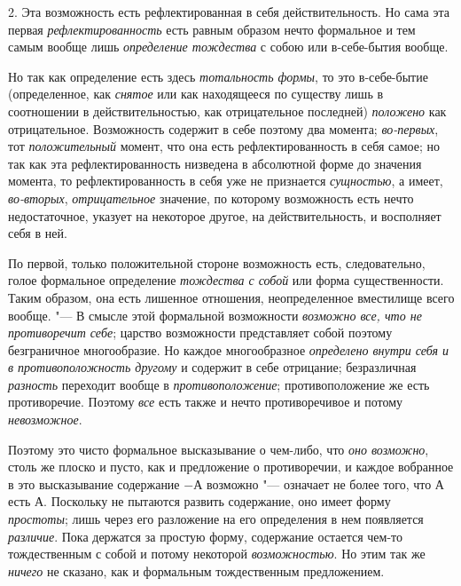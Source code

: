 2. Эта возможность есть рефлектированная в себя действительность. Но сама
эта первая {\em рефлектированность} есть равным образом
нечто формальное и тем самым вообще лишь
{\em определение тождества} с собою или в-себе-бытия
вообще.

Но так как определение есть здесь {\em тотальность
формы}, то это в-себе-бытие (определенное, как
{\em снятое} или как находящееся по существу лишь в
соотношении в действительностью, как отрицательное последней)
{\em положено} как отрицательное. Возможность содержит
в себе поэтому два момента; {\em во-первых}, тот
{\em положительный} момент, что она есть
рефлектированность в себя самое; но так как эта рефлектированность
низведена в абсолютной форме до значения момента, то рефлектированность в
себя уже не признается {\em сущностью}, а имеет,
{\em во-вторых},
{\em отрицательное} значение, по которому возможность
есть нечто недостаточное, указует на некоторое другое, на действительность,
и восполняет себя в ней.

По первой, только положительной стороне возможность есть, следовательно,
голое формальное определение {\em тождества с собой}
или форма существенности. Таким образом, она есть лишенное отношения,
неопределенное вместилище всего вообще. "--- В смысле этой формальной
возможности {\em возможно все, что не противоречит
себе}; царство возможности представляет собой поэтому безграничное
многообразие. Но каждое многообразное {\em определено
внутри себя и в противоположность другому} и содержит в себе отрицание;
безразличная {\em разность} переходит вообще в
{\em противоположение}; противоположение же есть
противоречие. Поэтому {\em все} есть также и нечто
противоречивое и потому {\em невозможное}.

Поэтому это чисто формальное высказывание о чем-либо, что
{\em оно возможно}, столь же плоско и пусто, как и
предложение о противоречии, и каждое вобранное в это высказывание
содержание $-А$ возможно "--- означает не более того, что $А$
есть $А$. Поскольку не пытаются развить содержание, оно имеет форму
{\em простоты}; лишь через его разложение на его
определения в нем появляется {\em различие}. Пока
держатся за простую форму, содержание остается чем-то тождественным с собой
и потому некоторой {\em возможностью}. Но этим так же
{\em ничего} не сказано, как и формальным тождественным
предложением.

